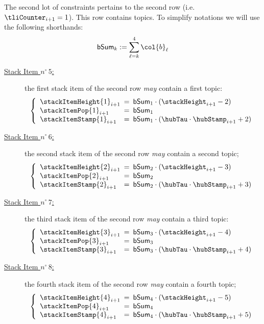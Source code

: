 The second lot of constraints pertains to the second row (i.e. $\tliCounter_{i + 1} = 1$). This row contains topics. To simplify notations we will use the following shorthands:
\[
	\bSum_{k} := \sum_{\ell = k}^{4} \col{b}_{\ell}
\]
\begin{description}
	\item[\underline{Stack Item $n^\circ\,5$:}] the first stack item of the second row \emph{may} contain a first topic:
		\[
			\left\{ \begin{array}{lcl}
				\stackItemHeight {1} _{i + 1} & \!\!\! = \!\!\! & \bSum_{1} \cdot (\stackHeight_{i + 1} - 2)            \\
				\stackItemPop    {1} _{i + 1} & \!\!\! = \!\!\! & \bSum_{1}                                             \\
				\stackItemStamp  {1} _{i + 1} & \!\!\! = \!\!\! & \bSum_{1} \cdot (\hubTau \cdot \hubStamp_{i + 1} + 2) \\
			\end{array} \right.
		\]
	\item[\underline{Stack Item $n^\circ\,6$:}] the second stack item of the second row \emph{may} contain a second topic;
		\[
			\left\{ \begin{array}{lcl}
				\stackItemHeight {2} _{i + 1} & \!\!\! = \!\!\! & \bSum_{2} \cdot (\stackHeight_{i + 1} - 3)            \\
				\stackItemPop    {2} _{i + 1} & \!\!\! = \!\!\! & \bSum_{2}                                             \\
				\stackItemStamp  {2} _{i + 1} & \!\!\! = \!\!\! & \bSum_{2} \cdot (\hubTau \cdot \hubStamp_{i + 1} + 3) \\
			\end{array} \right.
		\]
	\item[\underline{Stack Item $n^\circ\,7$:}] the third stack item of the second row \emph{may} contain a third topic:
		\[
			\left\{ \begin{array}{lcl}
				\stackItemHeight {3} _{i + 1} & \!\!\! = \!\!\! & \bSum_{3} \cdot (\stackHeight_{i + 1} - 4)            \\
				\stackItemPop    {3} _{i + 1} & \!\!\! = \!\!\! & \bSum_{3}                                             \\
				\stackItemStamp  {3} _{i + 1} & \!\!\! = \!\!\! & \bSum_{3} \cdot (\hubTau \cdot \hubStamp_{i + 1} + 4) \\
			\end{array} \right.
		\]
	\item[\underline{Stack Item $n^\circ\,8$:}] the fourth stack item of the second row \emph{may} contain a fourth topic;
		\[
			\left\{ \begin{array}{lcl}
				\stackItemHeight {4} _{i + 1} & \!\!\! = \!\!\! & \bSum_{4} \cdot (\stackHeight_{i + 1} - 5)            \\
				\stackItemPop    {4} _{i + 1} & \!\!\! = \!\!\! & \bSum_{4}                                             \\
				\stackItemStamp  {4} _{i + 1} & \!\!\! = \!\!\! & \bSum_{4} \cdot (\hubTau \cdot \hubStamp_{i + 1} + 5) \\
			\end{array} \right.
		\]
\end{description}
